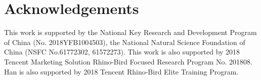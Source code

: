 \documentclass[11pt,a4paper]{article}
\begin{document}
\section{Acknowledgements}
This work is supported by the National Key Research and Development Program of China (No. 2018YFB1004503), the National Natural Science Foundation of China (NSFC No.61772302, 61572273). This work is also supported by 2018 Tencent Marketing Solution Rhino-Bird Focused Research Program No. 201808. Han is also supported by 2018 Tencent Rhino-Bird Elite Training Program.



\end{document}
